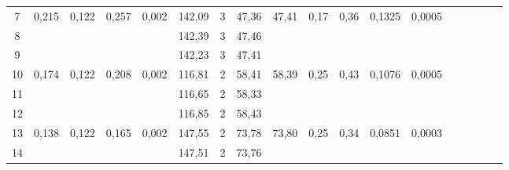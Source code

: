 \documentclass[a4paper,12pt]{article} %
\begin{document}
\begin{table}[H]
\begin{tabular}{|c|c|c|c|c|c|c|c|c|c|c|c|c|c|c|c|c|c|}
	7  & \multirow{3}{*}{0,215} & \multirow{3}{*}{0,122} & \multirow{3}{*}{0,257} & \multirow{3}{*}{0,002} & 142,09            & 3              & 47,36              & \multirow{3}{*}{47,41} & \multirow{3}{*}{0,17} & \multirow{3}{*}{0,36}  & \multirow{3}{*}{0,1325}                   & \multirow{3}{*}{0,0005} \\ \cline{1-1} \cline{6-8}
	8  &                        &                        &                        &                        & 142,39            & 3              & 47,46              &                        &                       &                        &                                           &                         \\ \cline{1-1} \cline{6-8}
	9  &                        &                        &                        &                        & 142,23            & 3              & 47,41              &                        &                       &                        &                                           &                         \\ \hline \hline
	10 & \multirow{3}{*}{0,174} & \multirow{3}{*}{0,122} & \multirow{3}{*}{0,208} & \multirow{3}{*}{0,002} & 116,81            & 2              & 58,41              & \multirow{3}{*}{58,39} & \multirow{3}{*}{0,25} & \multirow{3}{*}{0,43}  & \multirow{3}{*}{0,1076}                   & \multirow{3}{*}{0,0005} \\ \cline{1-1} \cline{6-8}
	11 &                        &                        &                        &                        & 116,65            & 2              & 58,33              &                        &                       &                        &                                           &                         \\ \cline{1-1} \cline{6-8}
	12 &                        &                        &                        &                        & 116,85            & 2              & 58,43              &                        &                       &                        &                                           &                         \\ \hline \hline
	13 & \multirow{3}{*}{0,138} & \multirow{3}{*}{0,122} & \multirow{3}{*}{0,165} & \multirow{3}{*}{0,002} & 147,55            & 2              & 73,78              & \multirow{3}{*}{73,80} & \multirow{3}{*}{0,25} & \multirow{3}{*}{0,34}  & \multirow{3}{*}{0,0851}                   & \multirow{3}{*}{0,0003} \\ \cline{1-1} \cline{6-8}
	14 &                        &                        &                        &                        & 147,51            & 2              & 73,76               &                        &                       &                        &                                           &                         \\ \cline{1-1} \cline{6-8}

\end{tabular}
\end{table}
\end{document}
